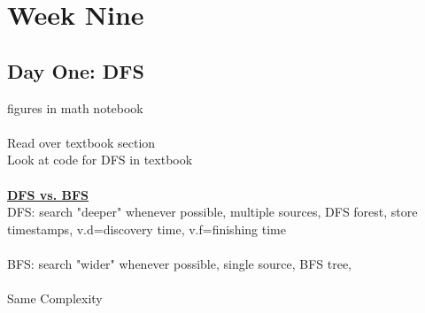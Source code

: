 \documentclass{article}
\begin{document}
	\section{Week Nine}
	\subsection{Day One: DFS}
	figures in math notebook\\\\
	Read over textbook section\\
	Look at code for DFS in textbook\\\\
	\underline{\textbf{DFS vs. BFS}}\\
	DFS: search "deeper" whenever possible, multiple sources, DFS forest, store timestamps, v.d=discovery time, v.f=finishing time\\\\
	BFS: search "wider" whenever possible, single source, BFS tree, \\\\
	Same Complexity\\\\\\
	
\end{document}
